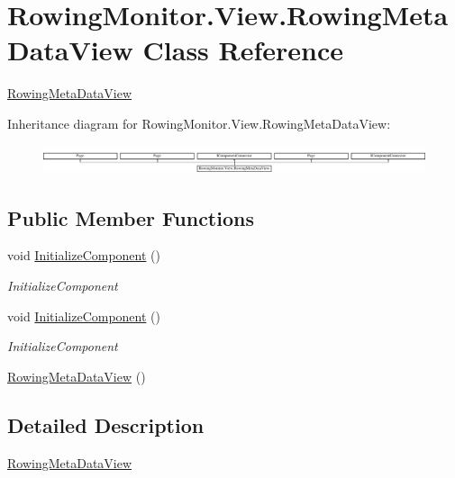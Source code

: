 \hypertarget{class_rowing_monitor_1_1_view_1_1_rowing_meta_data_view}{}\section{Rowing\+Monitor.\+View.\+Rowing\+Meta\+Data\+View Class Reference}
\label{class_rowing_monitor_1_1_view_1_1_rowing_meta_data_view}


\hyperlink{class_rowing_monitor_1_1_view_1_1_rowing_meta_data_view}{Rowing\+Meta\+Data\+View}  


Inheritance diagram for Rowing\+Monitor.\+View.\+Rowing\+Meta\+Data\+View\+:\begin{figure}[H]
\begin{center}
\leavevmode
\includegraphics[height=0.851711cm]{class_rowing_monitor_1_1_view_1_1_rowing_meta_data_view}
\end{center}
\end{figure}
\subsection*{Public Member Functions}
\begin{DoxyCompactItemize}
\item 
void \hyperlink{class_rowing_monitor_1_1_view_1_1_rowing_meta_data_view_a3d445692062269ce977812772d5c4d97}{Initialize\+Component} ()
\begin{DoxyCompactList}\small\item\em Initialize\+Component \end{DoxyCompactList}\item 
void \hyperlink{class_rowing_monitor_1_1_view_1_1_rowing_meta_data_view_a3d445692062269ce977812772d5c4d97}{Initialize\+Component} ()
\begin{DoxyCompactList}\small\item\em Initialize\+Component \end{DoxyCompactList}\item 
\hyperlink{class_rowing_monitor_1_1_view_1_1_rowing_meta_data_view_a0d89dc0f01cc88aed475f15a5aff4059}{Rowing\+Meta\+Data\+View} ()
\end{DoxyCompactItemize}


\subsection{Detailed Description}
\hyperlink{class_rowing_monitor_1_1_view_1_1_rowing_meta_data_view}{Rowing\+Meta\+Data\+View} 

